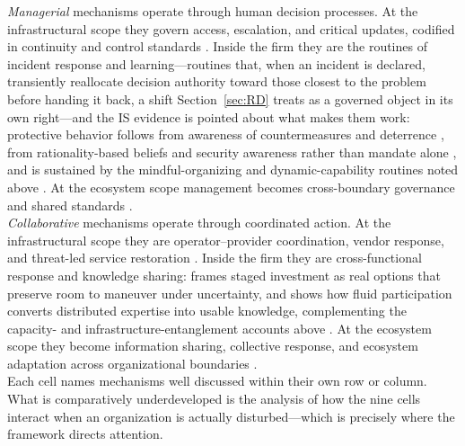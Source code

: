 \emph{Managerial} mechanisms operate through human decision processes. At the infrastructural scope they govern access, escalation, and critical updates, codified in continuity and control standards \autocite{boin2013resilient,calder2021iso,nist2024csf}. Inside the firm they are the routines of incident response and learning---routines that, when an incident is declared, transiently reallocate decision authority toward those closest to the problem before handing it back, a shift Section~\ref{sec:RD} treats as a governed object in its own right---and the IS evidence is pointed about what makes them work: protective behavior follows from awareness of countermeasures and deterrence \autocite{darcy2009user}, from rationality-based beliefs and security awareness rather than mandate alone \autocite{anderson2010practicing,bulgurcu2010information}, and is sustained by the mindful-organizing and dynamic-capability routines noted above \autocite{vogus2007organizational,weick2011managing,boh2023building}. At the ecosystem scope management becomes cross-boundary governance and shared standards \autocite{arnold2004informationsharing,bcbs2021operational,european2022regulation}.\\

\emph{Collaborative} mechanisms operate through coordinated action. At the infrastructural scope they are operator--provider coordination, vendor response, and threat-led service restoration \autocite{skopik2016problem,ecb2018tiber,hausken2020cyber}. Inside the firm they are cross-functional response and knowledge sharing: \textcite{benaroch2006real} frames staged investment as real options that preserve room to maneuver under uncertainty, and \textcite{faraj2011knowledge} shows how fluid participation converts distributed expertise into usable knowledge, complementing the capacity- and infrastructure-entanglement accounts above \autocite{lengnick2011developing,bhamra2011resilience,henfridsson2013generative}. At the ecosystem scope they become information sharing, collective response, and ecosystem adaptation across organizational boundaries \autocite{janssen2006network,enisa2017isacs,liu2022network}.\\

Each cell names mechanisms well discussed within their own row or column. What is comparatively underdeveloped is the analysis of how the nine cells interact when an organization is actually disturbed---which is precisely where the framework directs attention.\\

